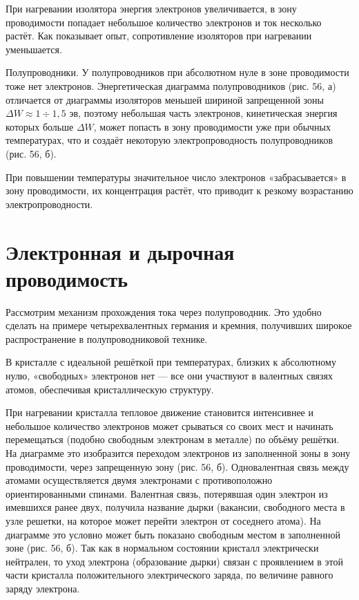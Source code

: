 \documentclass[a4paper,10pt]{book}
\begin{document}
При нагревании изолятора энергия электронов увеличивается, в зону проводимости попадает небольшое количество электронов и ток несколько растёт. Как показывает опыт, сопротивление изоляторов при нагревании уменьшается.

$\textbf{Полупроводники.}$ У полупроводников при абсолютном нуле в зоне проводимости тоже нет электронов. Энергетическая диаграмма полупроводников (рис. 56, $\textit{а}$) отличается от диаграммы изоляторов меньшей шириной запрещенной зоны $\Delta W \approx 1 \div 1,5\textit{ эв}$, поэтому небольшая часть электронов, кинетическая энергия которых больше $\Delta W$, может попасть в зону проводимости уже при обычных температурах, что и создаёт некоторую электропроводность полупроводников (рис. 56, $\textit{б}$).

При повышении температуры значительное число электронов «забрасывается» в зону проводимости, их концентрация растёт, что приводит к резкому возрастанию электропроводности.

\section{Электронная и дырочная проводимость}

Рассмотрим механизм прохождения тока через полупроводник. Это удобно сделать на примере четырехвалентных германия и кремния, получивших широкое распространение в полупроводниковой технике.

В кристалле с идеальной решёткой при температурах, близких к абсолютному нулю, «свободных» электронов нет — все они участвуют в валентных связях атомов, обеспечивая кристаллическую структуру.

При нагревании кристалла тепловое движение становится интенсивнее и небольшое количество электронов может срываться со  своих мест и начинать перемещаться (подобно свободным электронам в металле) по объёму решётки. На диаграмме это изобразится переходом электронов из заполненной зоны в зону проводимости, через запрещенную зону (рис. 56, $\textit{б}$). Одновалентная связь между атомами осуществляется двумя электронами с противоположно  ориентированными спинами. Валентная связь, потерявшая один электрон из имевшихся ранее двух, получила название дырки (вакансии, свободного места в узле решетки, на которое может перейти электрон от соседнего атома). На диаграмме это условно может быть показано свободным местом в заполненной зоне  (рис. 56, $\textit{б}$). Так как в нормальном состоянии кристалл электрически нейтрален, то уход электрона (образование дырки) связан с проявлением в этой части кристалла положительного электрического заряда, по величине равного заряду электрона.
\end{document}
